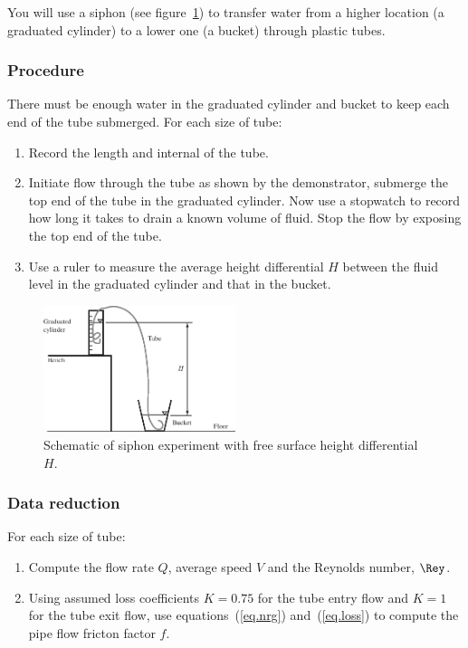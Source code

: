 \documentclass[a4paper,11pt]{article} \pagestyle{plain}
\begin{document}
You will use a siphon (see figure~\ref{fig.siphon}) to transfer water
from a higher location (a graduated cylinder) to a lower one (a
bucket) through plastic tubes.

\subsubsection*{Procedure}
There must be enough water in the graduated cylinder and bucket to
keep each end of the tube submerged.  For each size of tube:
\begin{enumerate}
\item
Record the length and internal of the tube.
\item
Initiate flow through the tube as shown by the demonstrator, submerge
the top end of the tube in the graduated cylinder. Now use a stopwatch
to record how long it takes to drain a known volume of fluid. Stop the
flow by exposing the top end of the tube.
\item
Use a ruler to measure the average height differential $H$ between the
fluid level in the graduated cylinder and that in the bucket.
\end{enumerate}

\begin{figure}
\begin{center}
\includegraphics[width=0.5\textwidth]{Siphon.eps}
\end{center}
\caption{Schematic of siphon experiment with free surface height
  differential $H$.}
\label{fig.siphon}
\end{figure}

\subsubsection*{Data reduction}
For each size of tube:
\begin{enumerate}
\item
Compute the flow rate $Q$, average speed $V$ and the Reynolds number,
$\Rey$.
\item
Using assumed loss coefficients $K=0.75$ for the tube entry flow and
$K=1$ for the tube exit flow, use equations~(\ref{eq.nrg})
and~(\ref{eq.loss}) to compute the pipe flow fricton factor $f$.
\end{enumerate}
\end{document}
